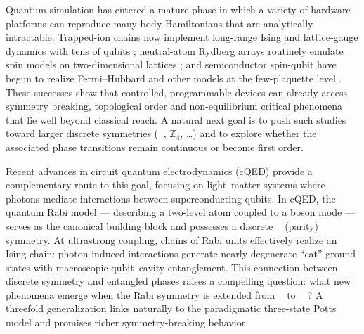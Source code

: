 \documentclass[reprint, aps, prx, amsmath, amssymb, longbibliography, superscriptaddress]{revtex4-2}
\DeclareMathOperator{\Zthree}{\mathbb{Z}_3}
\DeclareMathOperator{\Ztwo}{\mathbb{Z}_2}
\begin{document}
Quantum simulation has entered a mature phase in which a variety of hardware platforms can reproduce many-body Hamiltonians that are analytically intractable. Trapped-ion chains now implement long-range Ising and lattice-gauge dynamics with tens of qubits \cite{tan_domainwall_2021, kyprianidis_observation_2021,brydges_probing_2019,zhang_observation_2017,martinez_realtime_2016,meth_simulating_2025}; neutral-atom Rydberg arrays routinely emulate spin models on two-dimensional lattices \cite{madjarov_highfidelity_2020,semeghini_probing_2021,scholl_quantum_2021,manovitz_quantum_2025,bernien_probing_2017}; and semiconductor spin-qubit have begun to realize Fermi–Hubbard and other models at the few-plaquette level \cite{dehollain_nagaoka_2020, hensgens_quantum_2017, kiczynski_engineering_2022, vandiepen_quantum_2021, wang_experimental_2022, wang_probing_2023}. These successes show that controlled, programmable devices can already access symmetry breaking, topological order and non-equilibrium critical phenomena that lie well beyond classical reach. A natural next goal is to push such studies toward larger discrete symmetries ($\Zthree$, $\mathbb{Z}_4$, …) and to explore whether the associated phase transitions remain continuous or become first order.

Recent advances in circuit quantum electrodynamics (cQED) provide a complementary route to this goal, focusing on light–matter systems where photons mediate interactions between superconducting qubits\cite{kurpiers_deterministic_2018,vanloo_photonmediated_2013,astafiev_resonance_2010}. In cQED, the quantum Rabi model \cite{braumuller_analog_2017, braak_integrability_2011,hwang_quantum_2015, chen_shortcuts_2021} --- describing a two-level atom coupled to a boson mode --- serves as the canonical building block and possesses a discrete $\Ztwo $ (parity) symmetry. At ultrastrong coupling, chains of Rabi units effectively realize an Ising chain\cite{hwang_largescale_2013}: photon-induced interactions generate nearly degenerate “cat” ground states with macroscopic qubit–cavity entanglement. This connection between discrete symmetry and entangled phases raises a compelling question: what new phenomena emerge when the Rabi symmetry is extended from $\Ztwo$ to $\Zthree$ \cite{albert_quantum_2012, zhang_z_n_2014, sedov_chiral_2020,kozin_quantum_2024}? A threefold generalization links naturally to the paradigmatic three-state Potts model and promises richer symmetry-breaking behavior.
\end{document}
